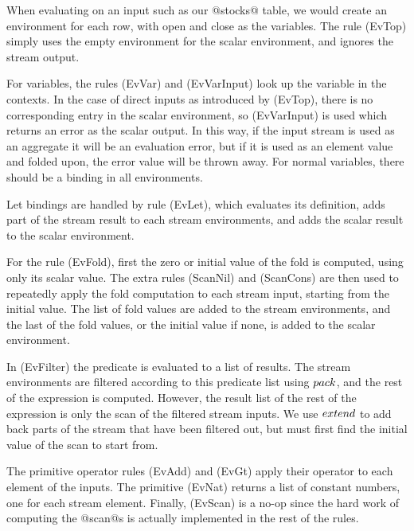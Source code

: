 
When evaluating on an input such as our @stocks@ table, we would create an environment for each row, with open and close as the variables.
The rule (EvTop) simply uses the empty environment for the scalar environment, and ignores the stream output.

For variables, the rules (EvVar) and (EvVarInput) look up the variable in the contexts.
In the case of direct inputs as introduced by (EvTop), there is no corresponding entry in the scalar environment, so (EvVarInput) is used which returns an error as the scalar output.
In this way, if the input stream is used as an aggregate it will be an evaluation error, but if it is used as an element value and folded upon, the error value will be thrown away.
For normal variables, there should be a binding in all environments.

Let bindings are handled by rule (EvLet), which evaluates its definition, adds part of the stream result to each stream environments, and adds the scalar result to the scalar environment.

For the rule (EvFold), first the zero or initial value of the fold is computed, using only its scalar value.
The extra rules (ScanNil) and (ScanCons) are then used to repeatedly apply the fold computation to each stream input, starting from the initial value.
The list of fold values are added to the stream environments, and the last of the fold values, or the initial value if none, is added to the scalar environment.

In (EvFilter) the predicate is evaluated to a list of results. 
The stream environments are filtered according to this predicate list using $\mit{pack}$, and the rest of the expression is computed.
However, the result list of the rest of the expression is only the scan of the filtered stream inputs.
We use $\mit{extend}$ to add back parts of the stream that have been filtered out, but must first find the initial value of the scan to start from.

The primitive operator rules (EvAdd) and (EvGt) apply their operator to each element of the inputs.
The primitive (EvNat) returns a list of constant numbers, one for each stream element.
Finally, (EvScan) is a no-op since the hard work of computing the @scan@s is actually implemented in the rest of the rules.



